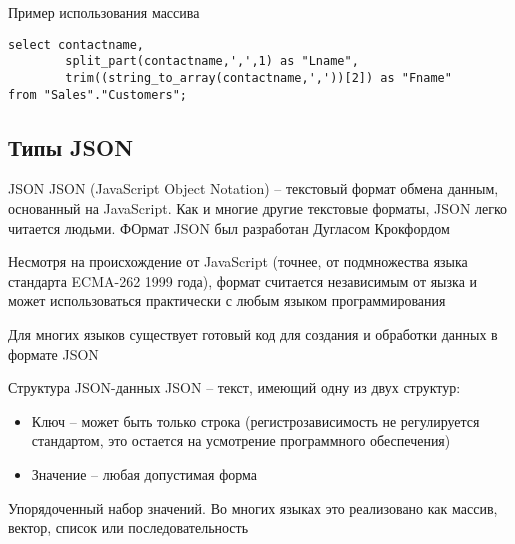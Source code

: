 \documentclass[12pt]{article}
\begin{document}
\begin{Example}{Пример использования массива}
\begin{lstlisting}
select contactname,
        split_part(contactname,',',1) as "Lname",
        trim((string_to_array(contactname,','))[2]) as "Fname"
from "Sales"."Customers";
\end{lstlisting}
\end{Example}

\newpage 

\subsection{Типы JSON}

\begin{defin}{JSON}
    JSON (JavaScript Object Notation) -- текстовый формат обмена данным, основанный на JavaScript. Как и многие другие текстовые форматы, JSON легко читается людьми. ФОрмат JSON был разработан Дугласом Крокфордом 

    Несмотря на происхождение от JavaScript (точнее, от подмножества языка стандарта ECMA-262 1999 года), формат считается независимым от яызка и может использоваться практически с любым языком программирования 

    Для многих языков существует готовый код для создания и обработки данных в формате JSON 
\end{defin}

\begin{nota}{Структура JSON-данных}
    JSON -- текст, имеющий одну из двух структур: 

    \begin{itemize}
        \item Ключ -- может быть только строка (регистрозависимость не регулируется стандартом, это остается на усмотрение программного обеспечения)
        \item Значение -- любая допустимая форма
    \end{itemize}

    Упорядоченный набор значений. Во многих языках это реализовано как массив, вектор, список или последовательность
\end{nota}
\end{document}
